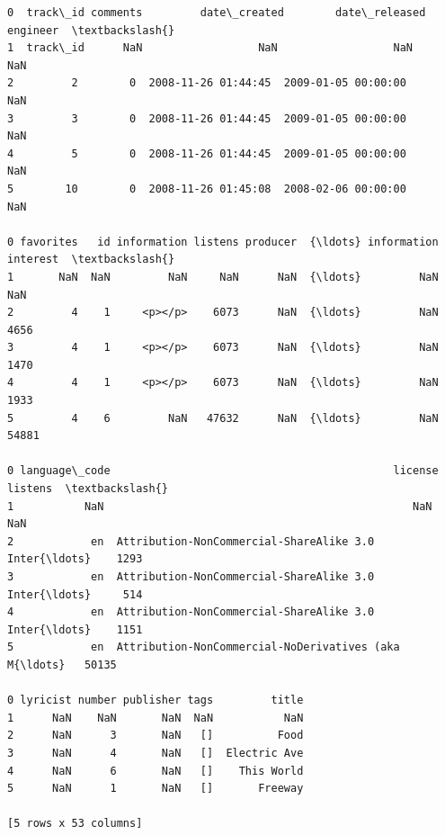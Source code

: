 \documentclass[11pt]{article}
\makeatletter
\newcommand{\boxspacing}{\kern\kvtcb@left@rule\kern\kvtcb@boxsep}
\newcommand{\prompt}[4]{
        {\ttfamily\llap{{\color{#2}[#3]:\hspace{3pt}#4}}\vspace{-\baselineskip}}
    }
\makeatother
\begin{document}
            \begin{tcolorbox}[breakable, size=fbox, boxrule=.5pt, pad at break*=1mm, opacityfill=0]
\prompt{Out}{outcolor}{4}{\boxspacing}
\begin{Verbatim}[commandchars=\\\{\}]
0  track\_id comments         date\_created        date\_released engineer  \textbackslash{}
1  track\_id      NaN                  NaN                  NaN      NaN
2         2        0  2008-11-26 01:44:45  2009-01-05 00:00:00      NaN
3         3        0  2008-11-26 01:44:45  2009-01-05 00:00:00      NaN
4         5        0  2008-11-26 01:44:45  2009-01-05 00:00:00      NaN
5        10        0  2008-11-26 01:45:08  2008-02-06 00:00:00      NaN

0 favorites   id information listens producer  {\ldots} information interest  \textbackslash{}
1       NaN  NaN         NaN     NaN      NaN  {\ldots}         NaN      NaN
2         4    1     <p></p>    6073      NaN  {\ldots}         NaN     4656
3         4    1     <p></p>    6073      NaN  {\ldots}         NaN     1470
4         4    1     <p></p>    6073      NaN  {\ldots}         NaN     1933
5         4    6         NaN   47632      NaN  {\ldots}         NaN    54881

0 language\_code                                            license listens  \textbackslash{}
1           NaN                                                NaN     NaN
2            en  Attribution-NonCommercial-ShareAlike 3.0 Inter{\ldots}    1293
3            en  Attribution-NonCommercial-ShareAlike 3.0 Inter{\ldots}     514
4            en  Attribution-NonCommercial-ShareAlike 3.0 Inter{\ldots}    1151
5            en  Attribution-NonCommercial-NoDerivatives (aka M{\ldots}   50135

0 lyricist number publisher tags         title
1      NaN    NaN       NaN  NaN           NaN
2      NaN      3       NaN   []          Food
3      NaN      4       NaN   []  Electric Ave
4      NaN      6       NaN   []    This World
5      NaN      1       NaN   []       Freeway

[5 rows x 53 columns]
\end{Verbatim}
\end{tcolorbox}
        
\end{document}
